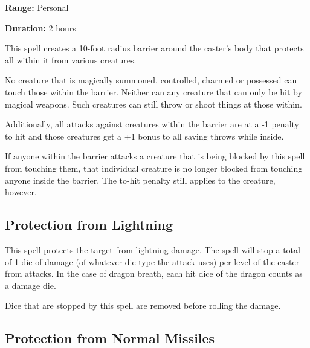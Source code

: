 \begin{multicols*}{2}
{\textbf{Range:} Personal

\textbf{Duration:} 2 hours}

This spell creates a 10-foot radius barrier around the caster’s body that protects all within it from various creatures.

No creature that is magically summoned, controlled, charmed or possessed can touch those within the barrier. Neither can any creature that can only be hit by magical weapons. Such creatures can still throw or shoot things at those within.

Additionally, all attacks against creatures within the barrier are at a -1 penalty to hit and those creatures get a +1 bonus to all saving throws while inside.

If anyone within the barrier attacks a creature that is being blocked by this spell from touching them, that individual creature is no longer blocked from touching anyone inside the barrier. The to-hit penalty still applies to the creature, however.

\subsection{Protection from Lightning}\label{spell:Protection from Lightning}

This spell protects the target from lightning damage. The spell will stop a total of 1 die of damage (of whatever die type the attack uses) per level of the caster from attacks. In the case of dragon breath, each hit dice of the dragon counts as a damage die.

Dice that are stopped by this spell are removed before rolling the damage.

\subsection{Protection from Normal Missiles}\label{spell:Protection from Normal Missiles}


\end{multicols*}
